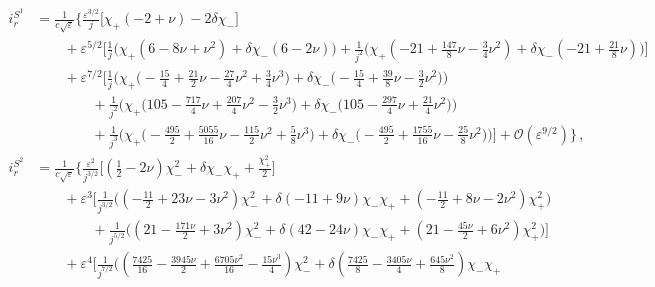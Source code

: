 \documentclass[prd,superscriptaddress,preprintnumbers,tightenlines,nofootinbib, eqsecnum]{revtex4-2}
\newcommand{\nn}{\nonumber}
\newcommand{\chip}{\chi_{+}}
\newcommand{\chim}{\chi_{-}}
\begin{document}
\begin{subequations}\label{eq:ir_S1234_of_varpesilon_j_expression}
\begin{align} \label{seq:irS1_of_varpesilon_j_expression}
    i_r^{S^1}&= \frac{1}{c\sqrt{\varepsilon}} \Bigg\{\frac{\varepsilon^{3/2}}{j}\Bigg[\chip(-2+\nu) - 2 \delta \chim\Bigg] \nn\\
    & \qquad + \varepsilon^{5/2}\Bigg[\frac{1}{j}\Bigg(\chip(6-8\nu+\nu^2) + \delta \chim(6-2\nu)\Bigg)+\frac{1}{j^2}\Bigg(\chip(-21+\frac{147}{8}\nu- \frac{3}{4}\nu^2) + \delta \chim(-21+\frac{21}{8}\nu)\Bigg)\Bigg] \nn\\
    & \qquad + \varepsilon^{7/2}\Bigg[
    \frac{1}{j}\Bigg(\chip \bigg(-\frac{15}{4}+\frac{21}{2}\nu-\frac{27}{4}\nu^2+\frac{3}{4}\nu^3 \bigg) + \delta \chim \bigg(-\frac{15}{4}+ \frac{39}{8}\nu- \frac{3}{2}\nu^2\bigg)\Bigg)\nn\\
   &\qquad\qquad + \frac{1}{j^2}\Bigg(\chip \bigg(105-\frac{717}{4}\nu+\frac{207}{4}\nu^2-\frac{3}{2}\nu^3 \bigg) + \delta \chim \bigg(105- \frac{297}{4}\nu+ \frac{21}{4}\nu^2\bigg)\Bigg) \nn\\
   &\qquad\qquad + \frac{1}{j^3}\Bigg(\chip \bigg(-\frac{495}{2}+\frac{5055}{16}\nu-\frac{115}{2}\nu^2+\frac{5}{8}\nu^3 \bigg) + \delta \chim \bigg(-\frac{495}{2}+ \frac{1755}{16}\nu- \frac{25}{8}\nu^2 \bigg)\Bigg)\Bigg]
    +\mathcal{O}(\varepsilon^{9/2})\Bigg\} \,, \\
    \label{seq:irS2_of_varpesilon_j_expression}
    i_r^{S^2} &= \frac{1}{c \sqrt{\varepsilon }}\Bigg\{\frac{\varepsilon ^2}{j^{3/2}} \Bigg[\left(\frac{1}{2}-2 \nu \right) \chi_{-}^2+\delta  \chi_{-} \chi_{+}+\frac{\chi_{+}^2}{2}\Bigg]\nn\\
    &\qquad+\varepsilon ^3
   \Bigg[\frac{1}{j^{3/2}}\Bigg(\left(-\frac{11}{2}+23 \nu -3 \nu ^2\right) \chi_{-}^2+\delta  (-11+9 \nu ) \chi_{-} \chi_{+}+\left(-\frac{11}{2}+8 \nu -2 \nu ^2\right) \chi_{+}^2\Bigg) \nn\\
   &\qquad\qquad +\frac{1}{j^{5/2}}\Bigg(\left(21-\frac{171 \nu }{2}+3 \nu ^2\right) \chi_{-}^2+\delta  (42-24 \nu ) \chi_{-} \chi_{+}+\left(21-\frac{45 \nu }{2}+6 \nu ^2\right) \chi_{+}^2\Bigg)\Bigg]\nn\\
   &\qquad +\varepsilon ^4 \Bigg[\frac{1}{j^{7/2}}\Bigg(\left(\frac{7425}{16}-\frac{3945 \nu }{2}+\frac{6705 \nu ^2}{16}-\frac{15 \nu ^3}{4}\right) \chi_{-}^2+\delta \left(\frac{7425}{8}-\frac{3405 \nu }{4}+\frac{645 \nu ^2}{8}\right) \chi_{-} \chi_{+} \nn\\

\end{align}
\end{subequations}
\end{document}
